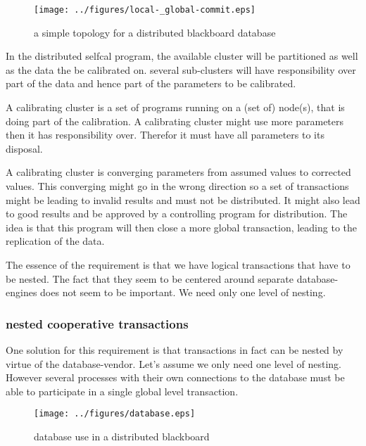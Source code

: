 \documentclass[]{lofar}
\begin{document}
      \begin{figure}
        \texttt{[image: ../figures/local-\_global-commit.eps]}
        \hypertarget{fig:localGlobalCommit}{}
        \caption{a simple topology for a distributed blackboard database\label{fig:localGlobalCommit}}
      \end{figure}

      In the distributed selfcal program, the available cluster will
      be partitioned as well as the data the be calibrated on. several
      sub-clusters will have responsibility over part of the data and
      hence part of the parameters to be calibrated.

      A calibrating cluster is a set of programs running on a (set of)
      node(s), that is doing part of the calibration.  A calibrating
      cluster might use more parameters then it has responsibility
      over. Therefor it must have all parameters to its disposal.

      A calibrating cluster is converging parameters from assumed
      values to corrected values. This converging might go in the
      wrong direction so a set of transactions might be leading to
      invalid results and must not be distributed. It might also lead
      to good results and be approved by a controlling program for
      distribution. The idea is that this program will then close a
      more global transaction, leading to the replication of the data.

      The essence of the requirement is that we have logical
      transactions that have to be nested. The fact that they seem to
      be centered around separate database-engines does not seem to be
      important. We need only one level of nesting.

      \subsubsection{nested cooperative transactions}
      \label{subsubsec:nested-cooperative-transaction}\hypertarget{subsubsec:nested-cooperative-transaction}{}

        One solution for this requirement is that transactions in fact
        can be nested by virtue of the database-vendor. Let's assume
        we only need one level of nesting. However several processes
        with their own connections to the database must be able to
        participate in a single global level transaction.

        \begin{figure}
          \texttt{[image: ../figures/database.eps]}
          \hypertarget{fig:database}{}
          \caption{database use in a distributed blackboard\label{fig:database}}
        \end{figure}
\end{document}
